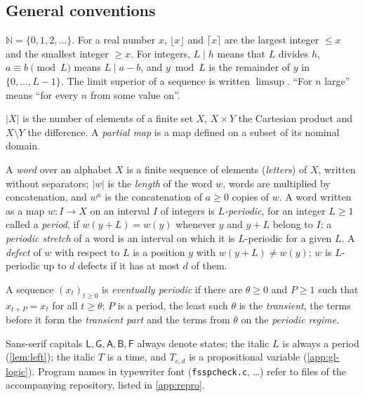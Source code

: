 {\small
\subsection{General conventions}\label{app:gl-general}
\begin{description}[style=unboxed,leftmargin=1em,font=\normalfont\bfseries,itemsep=1pt,parsep=0pt,topsep=2pt]
\item[Integers.] $\mathbb N=\{0,1,2,\dots\}$. For a real number $x$,
  $\lfloor x\rfloor$ and $\lceil x\rceil$ are the largest integer ${}\le x$
  and the smallest integer ${}\ge x$. For integers, $L\mid h$ means that
  $L$ divides $h$, $a\equiv b\pmod L$ means $L\mid a-b$, and $y\bmod L$
  is the remainder of $y$ in $\{0,\dots,L-1\}$. The limit superior of a
  sequence is written $\limsup$. ``For $n$ large'' means ``for every $n$
  from some value on''.
\item[Sets and maps.] $|X|$ is the number of elements of a finite set
  $X$, $X\times Y$ the Cartesian product and $X\setminus Y$ the
  difference. A \emph{partial map} is a map defined on a subset of its
  nominal domain.
\item[Words.] A \emph{word} over an alphabet $X$ is a finite sequence of
  elements (\emph{letters}) of $X$, written without separators; $|w|$ is
  the \emph{length} of the word $w$, words are multiplied by
  concatenation, and $w^a$ is the concatenation of $a\ge0$ copies of $w$.
  A word written as a map $w:I\to X$ on an interval $I$ of integers is
  \emph{$L$-periodic}, for an integer $L\ge1$ called a \emph{period}, if
  $w(y+L)=w(y)$ whenever $y$ and $y+L$ belong to $I$; a \emph{periodic
  stretch} of a word is an interval on which it is $L$-periodic for a
  given $L$. A \emph{defect} of $w$ with respect to $L$ is a position $y$
  with $w(y+L)\neq w(y)$; $w$ is $L$-periodic up to $d$ defects if it has at
  most $d$ of them.
\item[Eventually periodic.] A sequence $(x_t)_{t\ge0}$ is
  \emph{eventually periodic} if there are $\theta\ge0$ and $P\ge1$ such
  that $x_{t+P}=x_t$ for all $t\ge\theta$; $P$ is a period, the least
  such $\theta$ is the \emph{transient}, the terms before it form the
  \emph{transient part} and the terms from $\theta$ on the \emph{periodic
  regime}.
\item[Typography.] Sans-serif capitals $\mathsf L,\mathsf G,\mathsf
  A,\mathsf B,\mathsf F$ always denote states; the italic $L$ is always a
  period (\cref{lem:left}); the italic $T$ is a time, and $T_{e,d}$ is a
  propositional variable (\cref{app:gl-logic}). Program names in typewriter font
  (\texttt{fsspcheck.c}, \dots) refer to files of the accompanying
  repository, listed in \ref{app:repro}.
\end{description}

}
